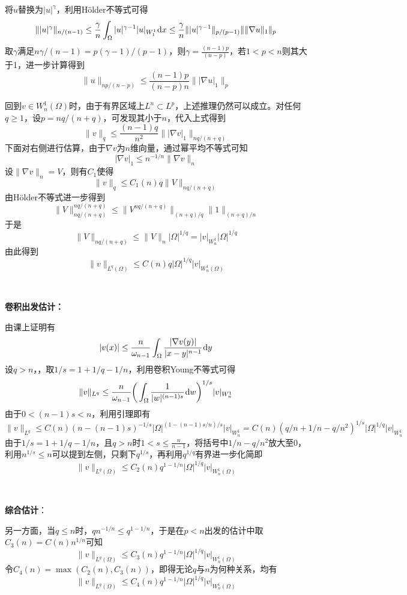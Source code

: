 \documentclass[a4paper,UTF8,fontset=windows,10pt]{ctexart}
\newcommand*{\dr}{\hspace{0.07em}\mathrm{d}}
\begin{document}
\begin{enumerate}
    将$u$替换为$|u|^\gamma$，利用H\"older不等式可得
    $$\||u|^\gamma\|_{n/(n-1)}\le\frac{\gamma}{n}\int_\Omega|u|^{\gamma-1}|u|_{W_1^1}\dr x\le\frac{\gamma}{n}\||u|^{\gamma-1}\|_{p/(p-1)}\|\|\nabla u\|_1\|_p$$
    取$\gamma$满足$n\gamma/(n-1)=p(\gamma-1)/(p-1)$，则$\gamma=\frac{(n-1)p}{(n-p)}$，若$1<p<n$则其大于1，进一步计算得到
    $$\|u\|_{np/(n-p)}\le\frac{(n-1)p}{(n-p)n}\||\nabla u|_1\|_p$$
    
    回到$v\in W_n^1(\Omega)$时，由于有界区域上$L^n\subset L^p$，上述推理仍然可以成立。对任何$q\ge 1$，设$p=nq/(n+q)$，可发现其小于$n$，代入上式得到
    $$\|v\|_q\le\frac{(n-1)q}{n^2}\||\nabla v|_1\|_{nq/(n+q)}$$
    下面对右侧进行估算，由于$\nabla v$为$n$维向量，通过幂平均不等式可知
    $$|\nabla v|_1\le n^{-1/n}\|\nabla v\|_n$$
    设$\|\nabla v\|_n=V$，则有$C_1$使得
    $$\|v\|_q\le C_1(n)q\|V\|_{nq/(n+q)}$$
    由H\"older不等式进一步得到
    $$\|V\|_{nq/(n+q)}^{nq/(n+q)}\le\|V^{nq/(n+q)}\|_{(n+q)/q}\|1\|_{(n+q)/n}$$
    于是
    $$\|V\|_{nq/(n+q)}\le\|V\|_n|\Omega|^{1/q}=|v|_{W_n^1}|\Omega|^{1/q}$$
    由此得到
    $$\|v\|_{L^q(\Omega)}\le C(n)q|\Omega|^{1/q}|v|_{W_n^1(\Omega)}$$
    
    \
    
    \textbf{卷积出发估计：}
    
    由课上证明有
    $$|v(x)|\le\frac{n}{\omega_{n-1}}\int_\Omega\frac{|\nabla v(y)|}{|x-y|^{n-1}}\dr y$$
    设$q>n$，，取$1/s=1+1/q-1/n$，利用卷积Young不等式可得
    $$\|v\|_{L^q}\le\frac{n}{\omega_{n-1}}\bigg(\int_\Omega\frac{1}{|w|^{(n-1)s}}\dr w\bigg)^{1/s}|v|_{W_n^1}$$
    由于$0<(n-1)s<n$，利用引理即有
    $$\|v\|_{L^q}\le C(n)(n-(n-1)s)^{-1/s}|\Omega|^{(1-(n-1)s/n)/s}|v|_{W_n^1}=C(n)(q/n+1/n-q/n^2)^{1/s}|\Omega|^{1/q}|v|_{W_n^1}$$
    由于$1/s=1+1/q-1/n$，且$q>n$时$1<s\le\frac{n}{n-1}$，将括号中$1/n-q/n^2$放大至0，利用$n^{1/s}\le n$可以提到左侧，只剩下$q^{1/s}$，再利用$q^{1/q}$有界进一步化简即
    $$\|v\|_{L^q(\Omega)}\le C_2(n)q^{1-1/n}|\Omega|^{1/q}|v|_{W_n^1(\Omega)}$$
    
    \
    
    \textbf{综合估计}：
    
    另一方面，当$q\le n$时，$qn^{-1/n}\le q^{1-1/n}$，于是在$p<n$出发的估计中取$C_3(n)=C(n)n^{1/n}$可知
    $$\|v\|_{L^q(\Omega)}\le C_3(n)q^{1-1/n}|\Omega|^{1/q}|v|_{W_n^1(\Omega)}$$
    令$C_4(n)=\max(C_2(n),C_3(n))$，即得无论$q$与$n$为何种关系，均有
    $$\|v\|_{L^q(\Omega)}\le C_4(n)q^{1-1/n}|\Omega|^{1/q}|v|_{W_n^1(\Omega)}$$
\end{enumerate}
\end{document}

